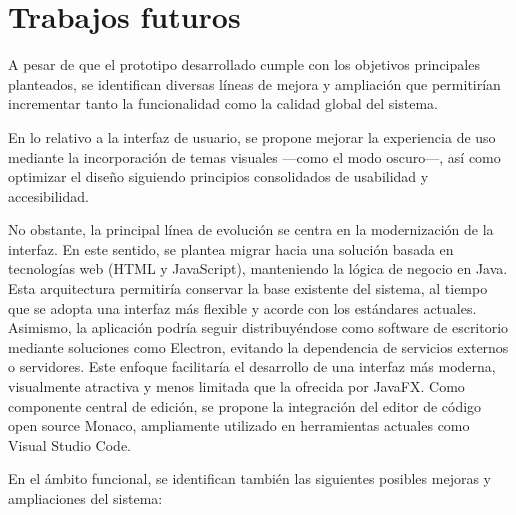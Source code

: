 \documentclass[../../main.tex]{subfiles}
\begin{document}
\clearpage

\section{Trabajos futuros}

A pesar de que el prototipo desarrollado cumple con los objetivos principales planteados, se identifican diversas líneas de mejora y ampliación que permitirían incrementar tanto la funcionalidad como la calidad global del sistema.

En lo relativo a la interfaz de usuario, se propone mejorar la experiencia de uso mediante la incorporación de temas visuales —como el modo oscuro—, así como optimizar el diseño siguiendo principios consolidados de usabilidad y accesibilidad.

No obstante, la principal línea de evolución se centra en la modernización de la interfaz. En este sentido, se plantea migrar hacia una solución basada en tecnologías web (HTML y JavaScript), manteniendo la lógica de negocio en Java. Esta arquitectura permitiría conservar la base existente del sistema, al tiempo que se adopta una interfaz más flexible y acorde con los estándares actuales. Asimismo, la aplicación podría seguir distribuyéndose como software de escritorio mediante soluciones como Electron, evitando la dependencia de servicios externos o servidores. Este enfoque facilitaría el desarrollo de una interfaz más moderna, visualmente atractiva y menos limitada que la ofrecida por JavaFX. Como componente central de edición, se propone la integración del editor de código open source Monaco, ampliamente utilizado en herramientas actuales como Visual Studio Code.

En el ámbito funcional, se identifican también las siguientes posibles mejoras y ampliaciones del sistema:
\end{document}
